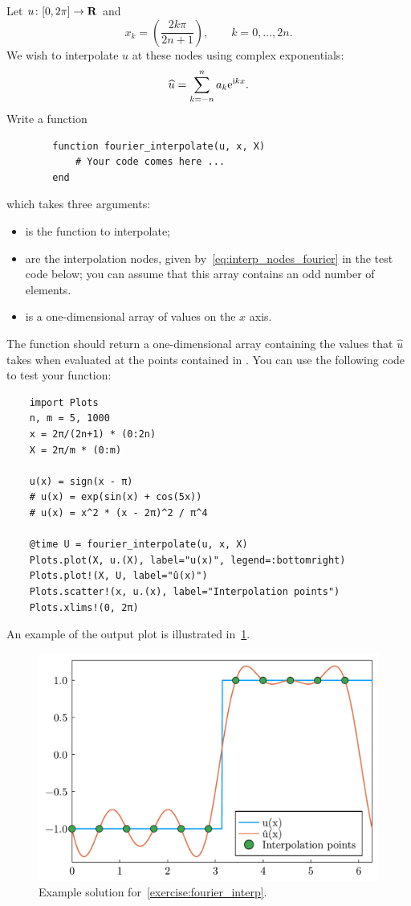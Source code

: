 \begin{compexercise}
    \label{exercise:fourier_interp}
    Let $u\colon [0, 2\pi] \to \mathbf R$ and
    \begin{equation}
        \label{eq:interp_nodes_fourier}
        x_k = \left( \frac{2k\pi}{2n+1} \right), \qquad k = 0, \dotsc, 2n.
    \end{equation}
    We wish to interpolate $u$ at these nodes using complex exponentials:
    \[
        \widehat u = \sum_{k=-n}^{n} a_k \mathrm e^{\mathrm i k x}.
    \]
    Write a function
    \begin{verbatim}
        function fourier_interpolate(u, x, X)
            # Your code comes here ...
        end
    \end{verbatim}
    which takes three arguments:
    \begin{itemize}
        \item {} is the function to interpolate;

        \item {} are the interpolation nodes, given by~\eqref{eq:interp_nodes_fourier} in the test code below;
            you can assume that this array contains an odd number of elements.

        \item {} is a one-dimensional array of values on the $x$ axis.
    \end{itemize}
    The function should return a one-dimensional array containing the values that $\widehat u$ takes when evaluated at the points contained in .
    You can use the following code to test your function:
    \begin{verbatim}
    import Plots
    n, m = 5, 1000
    x = 2π/(2n+1) * (0:2n)
    X = 2π/m * (0:m)

    u(x) = sign(x - π)
    # u(x) = exp(sin(x) + cos(5x))
    # u(x) = x^2 * (x - 2π)^2 / π^4

    @time U = fourier_interpolate(u, x, X)
    Plots.plot(X, u.(X), label="u(x)", legend=:bottomright)
    Plots.plot!(X, U, label="û(x)")
    Plots.scatter!(x, u.(x), label="Interpolation points")
    Plots.xlims!(0, 2π)
    \end{verbatim}
    An example of the output plot is illustrated in~\cref{fig:fourier}.
\end{compexercise}
\begin{figure}[ht]
    \centering
    \includegraphics[width=0.8\linewidth]{figures/fourier.pdf}
    \caption{Example solution for~\cref{exercise:fourier_interp}.}%
    \label{fig:fourier}
\end{figure}

